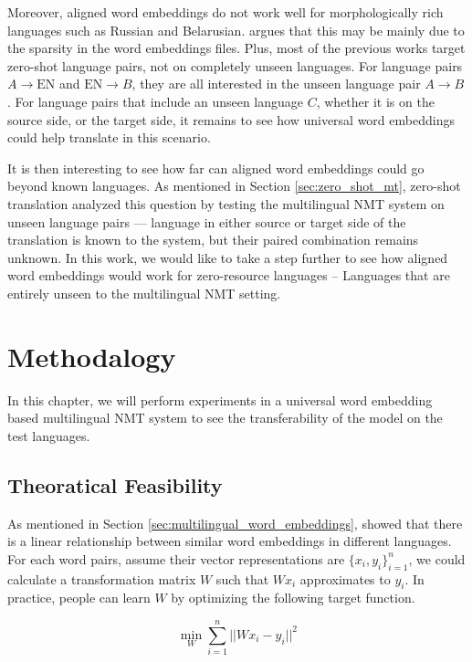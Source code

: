\documentclass[thesis,fonts=libertine]{cluu}
\begin{document}
Moreover, aligned word embeddings do not work well for morphologically rich languages such as Russian and Belarusian. \textcite{Qi:2018aa} argues that this may be mainly due to the sparsity in the word embeddings files. Plus, most of the previous works target zero-shot language pairs, not on completely unseen languages. For language pairs $A \rightarrow \text{EN}$ and $\text{EN} \rightarrow B$, they are all interested in the unseen language pair $A \rightarrow B$. For language pairs that include an unseen language $C$, whether it is on the source side, or the target side, it remains to see how universal word embeddings could help translate in this scenario.

It is then interesting to see how far can aligned word embeddings could go beyond known languages. As mentioned in Section \ref{sec:zero_shot_mt}, zero-shot translation analyzed this question by testing the multilingual NMT system on unseen language pairs --- language in either source or target side of the translation is known to the system, but their paired combination remains unknown. In this work, we would like to take a step further to see how aligned word embeddings would work for zero-resource languages -- Languages that are entirely unseen to the multilingual NMT setting.

\chapter{Methodalogy}
\label{chap:method}

In this chapter, we will perform experiments in a universal word embedding based multilingual NMT system to see the transferability of the model on the test languages.

\section{Theoratical Feasibility}

As mentioned in Section \ref{sec:multilingual_word_embeddings}, \textcite{Mikolov:2013ac} showed that there is a linear relationship between similar word embeddings in different languages. For each word pairs, assume their vector representations are $\{x_i, y_i\}_{i=1}^n$, we could calculate a transformation matrix $W$ such that $Wx_i$ approximates to $y_i$. In practice, people can learn $W$ by optimizing the following target function.

\begin{equation*}
  \min_W\sum_{i=1}^n||Wx_i-y_i||^2
\end{equation*}
\end{document}
